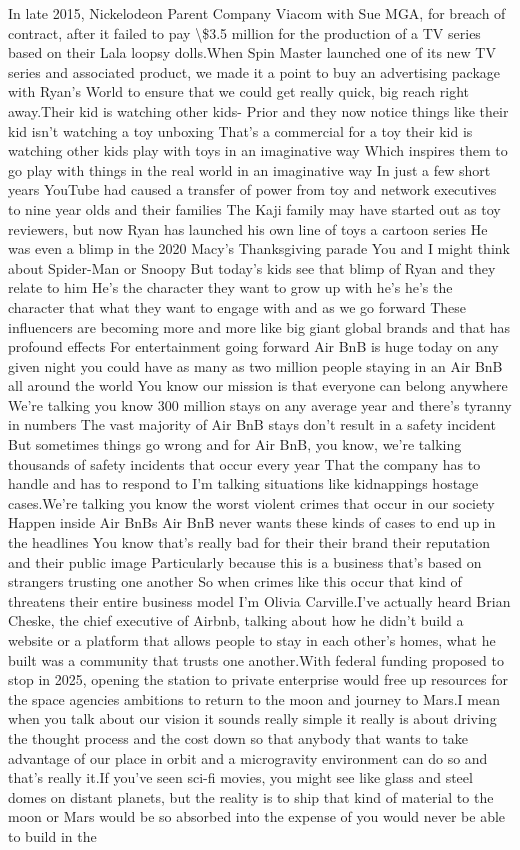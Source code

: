 \documentclass{article}%
\begin{document}
In late 2015, Nickelodeon Parent Company Viacom with Sue MGA, for breach of contract, after it failed to pay \textbackslash{}\$3.5 million for the production of a TV series based on their Lala loopsy dolls.When Spin Master launched one of its new TV series and associated product, we made it a point to buy an advertising package with Ryan's World to ensure that we could get really quick, big reach right away.Their kid is watching other kids{-}  Prior and they now notice things like their kid isn't watching a toy unboxing That's a commercial for a toy their kid is watching other kids play with toys in an imaginative way Which inspires them to go play with things in the real world in an imaginative way In just a few short years YouTube had caused a transfer of power from toy and network executives to nine year olds and their families The Kaji family may have started out as toy reviewers, but now Ryan has launched his own line of toys a cartoon series He was even a blimp in the 2020 Macy's Thanksgiving parade You and I might think about Spider{-}Man or Snoopy But today's kids see that blimp of Ryan and they relate to him He's the character they want to grow up with he's he's the character that what they want to engage with and as we go forward These influencers are becoming more and more like big giant global brands and that has profound effects For entertainment going forward Air BnB is huge today on any given night you could have as many as two million people staying in an Air BnB all around the world You know our mission is that everyone can belong anywhere We're talking you know 300 million stays on any average year and there's tyranny in numbers The vast majority of Air BnB stays don't result in a safety incident But sometimes things go wrong and for Air BnB, you know, we're talking thousands of safety incidents that occur every year That the company has to handle and has to respond to I'm talking situations like kidnappings hostage cases.We're talking you know the worst violent crimes that occur in our society Happen inside Air BnBs Air BnB never wants these kinds of cases to end up in the headlines You know that's really bad for their their brand their reputation and their public image Particularly because this is a business that's based on strangers trusting one another So when crimes like this occur that kind of threatens their entire business model I'm Olivia Carville.I've actually heard Brian Cheske, the chief executive of Airbnb, talking about how he didn't build a website or a platform that allows people to stay in each other's homes, what he built was a community that trusts one another.With federal funding proposed to stop in 2025, opening the station to private enterprise would free up resources for the space agencies ambitions to return to the moon and journey to Mars.I mean when you talk about our vision it sounds really simple it really is about driving the thought process and the cost down so that anybody that wants to take advantage of our place in orbit and a microgravity environment can do so and that's really it.If you've seen sci{-}fi movies, you might see like glass and steel domes on distant planets, but the reality is to ship that kind of material to the moon or Mars would be so absorbed into the expense of you would never be able to build in the 
\end{document}
